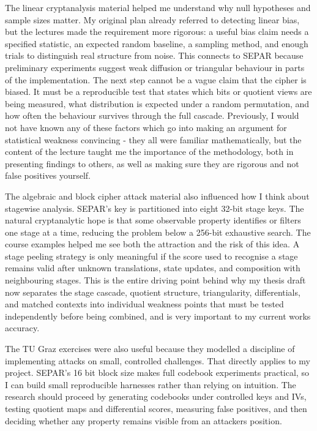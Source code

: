 \documentclass[11pt]{article}
\begin{document}
The linear cryptanalysis material helped me understand why null hypotheses and sample sizes matter. My original plan already referred to detecting linear bias, but the lectures made the requirement more rigorous: a useful bias claim needs a specified statistic, an expected random baseline, a sampling method, and enough trials to distinguish real structure from noise. This connects to SEPAR because preliminary experiments suggest weak diffusion or triangular behaviour in parts of the implementation. The next step cannot be a vague claim that the cipher is biased. It must be a reproducible test that states which bits or quotient views are being measured, what distribution is expected under a random permutation, and how often the behaviour survives through the full cascade. Previously, I would not have known any of these factors which go into making an argument for statistical weakness convincing - they all were familiar mathematically, but the content of the lecture taught me the importance of the methodology, both in presenting findings to others, as well as making sure they are rigorous and not false positives yourself.

The algebraic and block cipher attack material also influenced how I think about stagewise analysis. SEPAR's key is partitioned into eight 32-bit stage keys. The natural cryptanalytic hope is that some observable property identifies or filters one stage at a time, reducing the problem below a 256-bit exhaustive search. The course examples helped me see both the attraction and the risk of this idea. A stage peeling strategy is only meaningful if the score used to recognise a stage remains valid after unknown translations, state updates, and composition with neighbouring stages. This is the entire driving point behind why my thesis draft now separates the stage cascade, quotient structure, triangularity, differentials, and matched contexts into individual weakness points that must be tested independently before being combined, and is very important to my current works accuracy.

The TU Graz exercises were also useful because they modelled a discipline of implementing attacks on small, controlled challenges. That directly applies to my project. SEPAR's 16 bit block size makes full codebook experiments practical, so I can build small reproducible harnesses rather than relying on intuition. The research should proceed by generating codebooks under controlled keys and IVs, testing quotient maps and differential scores, measuring false positives, and then deciding whether any property remains visible from an attackers position.
\end{document}
